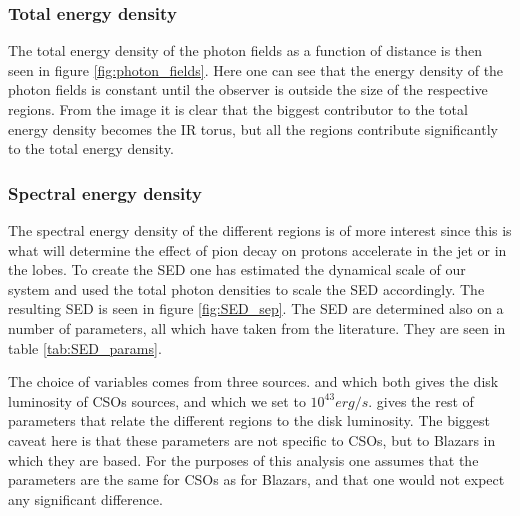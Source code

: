 \subsubsection*{Total energy density}
The total energy density of the photon fields as a function of distance is then seen in figure \ref{fig:photon_fields}. 
Here one can see that the energy density of the photon fields is constant until the observer is outside the size of the respective regions. 
From the image it is clear that the biggest contributor to the total energy density becomes the IR torus, but all the regions contribute significantly to the total energy density.

\subsubsection*{Spectral energy density}
The spectral energy density of the different regions is of more interest since this is what will determine the effect of pion decay on protons accelerate in the jet or in the lobes. To create the 
SED one has estimated the dynamical scale of our system and used the total photon densities to scale the SED accordingly. The resulting SED is seen in figure \ref{fig:SED_sep}. The SED are determined also on a number of 
parameters, all which have taken from the literature. They are seen in table \ref{tab:SED_params}.

The choice of variables comes from three sources. \cite{bronzini2024investigating} and \cite{kiehlmann2023compact} which both gives the disk luminosity of CSOs sources, and which we set to $10^{43} erg/s$. \cite{Ghisellini_2009} gives the rest of parameters that relate the different regions to the disk luminosity. The biggest caveat here is that these parameters are not specific to CSOs, but to Blazars in which they are based. For the purposes of this analysis one assumes that the parameters are the same for CSOs as for Blazars, and that one would not expect any significant difference. 

